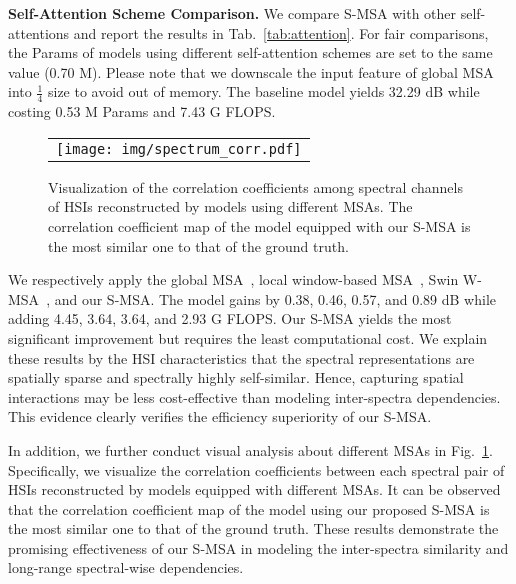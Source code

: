 \documentclass[10pt,twocolumn,letterpaper]{article}
\begin{document}
\noindent\textbf{Self-Attention Scheme Comparison.} We compare S-MSA with other self-attentions and report the  results in Tab.~\ref{tab:attention}. For fair comparisons, the Params of models using different self-attention schemes are set to the same value (0.70 M). Please note that we downscale the input feature of global MSA~\cite{global_msa} into $\frac{1}{4}$ size to avoid out of memory. The baseline model yields 32.29 dB while costing 0.53 M Params and 7.43 G FLOPS. 
\begin{figure}[h]
	\begin{center}
		\begin{tabular}[t]{c} \hspace{-2.5mm} 
			\texttt{[image: img/spectrum\_corr.pdf]}
		\end{tabular}
	\end{center}
	\vspace{-8mm}
	\caption{\small  Visualization of the correlation coefficients among spectral channels of HSIs reconstructed by models using different MSAs. The correlation coefficient map of the model equipped with our S-MSA is the most similar one to that of the ground truth. }
	\label{fig:sa_compare}
	\vspace{-5mm}
\end{figure}
We respectively apply the global MSA~\cite{global_msa}, local window-based MSA~\cite{liu2021swin}, Swin W-MSA~\cite{liu2021swin}, and our S-MSA. The model gains by 0.38, 0.46, 0.57, and 0.89 dB while adding 4.45, 3.64, 3.64, and 2.93 G FLOPS. Our S-MSA yields the most significant improvement but requires the least computational cost. We explain these results by the HSI characteristics  that the spectral representations are spatially sparse and spectrally highly self-similar. Hence, capturing spatial interactions may be less cost-effective than modeling inter-spectra dependencies. This evidence clearly verifies the efficiency superiority of our S-MSA. 

In addition, we further conduct visual analysis about different MSAs in Fig.~\ref{fig:sa_compare}. Specifically, we visualize the correlation coefficients between each spectral pair of HSIs reconstructed by models equipped with different MSAs. It can be observed that the correlation coefficient map of the model using our proposed S-MSA is the most similar one to that of the ground truth. These results demonstrate the promising effectiveness of our S-MSA in modeling the inter-spectra similarity and  long-range spectral-wise dependencies.    
\end{document}

